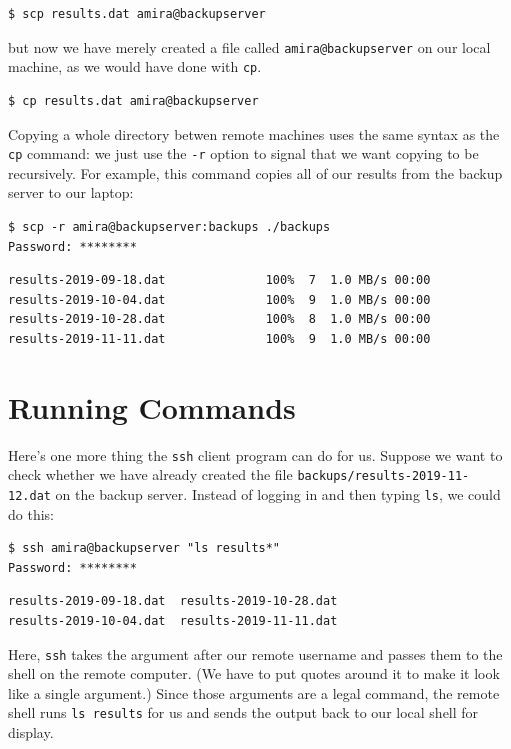\documentclass[
]{krantz}
\begin{document}
\begin{verbatim}
$ scp results.dat amira@backupserver
\end{verbatim}

but now we have merely created a file called \texttt{amira@backupserver} on our local machine,
as we would have done with \texttt{cp}.

\begin{verbatim}
$ cp results.dat amira@backupserver
\end{verbatim}

Copying a whole directory betwen remote machines uses the same syntax as the \texttt{cp} command:
we just use the \texttt{-r} option to signal that we want copying to be recursively.
For example,
this command copies all of our results from the backup server to our laptop:

\begin{verbatim}
$ scp -r amira@backupserver:backups ./backups
Password: ********
\end{verbatim}

\begin{verbatim}
results-2019-09-18.dat              100%  7  1.0 MB/s 00:00
results-2019-10-04.dat              100%  9  1.0 MB/s 00:00
results-2019-10-28.dat              100%  8  1.0 MB/s 00:00
results-2019-11-11.dat              100%  9  1.0 MB/s 00:00
\end{verbatim}

\hypertarget{ssh-cmd}{%
\section{Running Commands}\label{ssh-cmd}}

Here's one more thing the \texttt{ssh} client program can do for us.
Suppose we want to check whether we have already created the file
\texttt{backups/results-2019-11-12.dat} on the backup server.
Instead of logging in and then typing \texttt{ls},
we could do this:

\begin{verbatim}
$ ssh amira@backupserver "ls results*"
Password: ********
\end{verbatim}

\begin{verbatim}
results-2019-09-18.dat  results-2019-10-28.dat
results-2019-10-04.dat  results-2019-11-11.dat
\end{verbatim}

Here, \texttt{ssh} takes the argument after our remote username
and passes them to the shell on the remote computer.
(We have to put quotes around it to make it look like a single argument.)
Since those arguments are a legal command,
the remote shell runs \texttt{ls\ results} for us
and sends the output back to our local shell for display.
\end{document}
